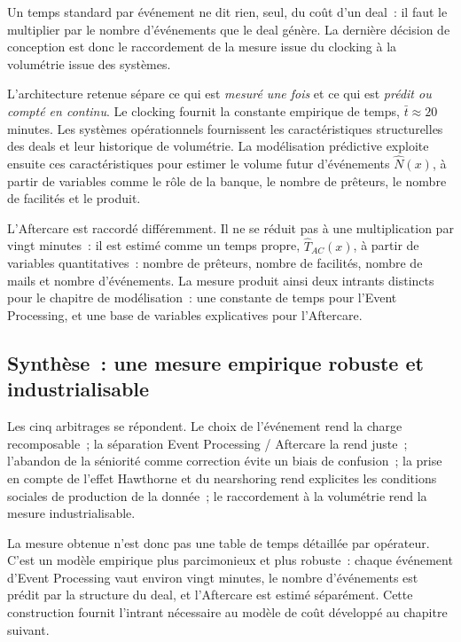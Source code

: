 Un temps standard par événement ne dit rien, seul, du coût d'un deal~: il faut le multiplier par le nombre d'événements que le deal génère. La dernière décision de conception est donc le raccordement de la mesure issue du clocking à la volumétrie issue des systèmes.

L'architecture retenue sépare ce qui est \emph{mesuré une fois} et ce qui est \emph{prédit ou compté en continu}. Le clocking fournit la constante empirique de temps, $\bar{t}\approx20$ minutes. Les systèmes opérationnels fournissent les caractéristiques structurelles des deals et leur historique de volumétrie. La modélisation prédictive exploite ensuite ces caractéristiques pour estimer le volume futur d'événements $\hat{N}(x)$, à partir de variables comme le rôle de la banque, le nombre de prêteurs, le nombre de facilités et le produit.

L'Aftercare est raccordé différemment. Il ne se réduit pas à une multiplication par vingt minutes~: il est estimé comme un temps propre, $\hat{T}_{AC}(x)$, à partir de variables quantitatives~: nombre de prêteurs, nombre de facilités, nombre de mails et nombre d'événements. La mesure produit ainsi deux intrants distincts pour le chapitre de modélisation~: une constante de temps pour l'Event Processing, et une base de variables explicatives pour l'Aftercare.

\subsection{Synthèse~: une mesure empirique robuste et industrialisable}
\label{sec:synthese-mesure}

Les cinq arbitrages se répondent. Le choix de l'événement rend la charge recomposable~; la séparation Event Processing / Aftercare la rend juste~; l'abandon de la séniorité comme correction évite un biais de confusion~; la prise en compte de l'effet Hawthorne et du nearshoring rend explicites les conditions sociales de production de la donnée~; le raccordement à la volumétrie rend la mesure industrialisable.

La mesure obtenue n'est donc pas une table de temps détaillée par opérateur. C'est un modèle empirique plus parcimonieux et plus robuste~: chaque événement d'Event Processing vaut environ vingt minutes, le nombre d'événements est prédit par la structure du deal, et l'Aftercare est estimé séparément. Cette construction fournit l'intrant nécessaire au modèle de coût développé au chapitre suivant.

\newpage